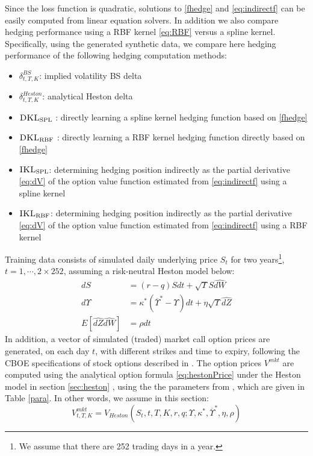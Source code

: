 \documentclass[letterpaper,12pt,titlepage,oneside,final]{book}
\numberwithin{equation}{section}
\theoremstyle{definition}
\newcommand{\Vmkt}{V^{mkt}}
\newcommand{\DKLs}{\bf\textsc{DKL}_{\text{SPL}}}
\newcommand{\DKLg}{\bf\textsc{DKL}_{\text{RBF}}}
\newcommand{\IKLs}{\bf\textsc{IKL}_{\text{SPL}}}
\newcommand{\IKLg}{\bf\textsc{IKL}_{\text{RBF}}}
\begin{document}
Since the loss function is  quadratic, solutions to \eqref{fhedge} and \eqref{eq:indirectf}
can be easily computed from linear equation solvers.
In addition we also compare hedging performance using a RBF kernel \eqref{eq:RBF} versus a spline kernel.
Specifically, using the generated synthetic data, we compare here hedging performance  of the following hedging computation methods:
 \begin{itemize}
 \item  $\delta^{BS}_{t,T,K}$:  implied  volatility BS delta
 \item $\delta^{Heston}_{t,T,K}$:   analytical Heston delta
 \item $\DKLs$ : directly learning a spline kernel hedging  function based on \eqref{fhedge}
 \item $\DKLg$ : directly learning a RBF kernel hedging  function directly based on \eqref{fhedge}
 \item ${\IKLs}$: determining hedging position indirectly  as the partial derivative \eqref{eq:dV} of the  option value function   estimated from \eqref{eq:indirectf} using a spline kernel

\item ${\IKLg}$: determining hedging position indirectly  as the partial derivative \eqref{eq:dV} of the  option value function   estimated from \eqref{eq:indirectf} using a RBF kernel

\end{itemize}

Training data consists of simulated daily underlying price $S_t$ for two years\footnote{We assume that there are 252 trading days in a year.}, $t=1,\cdots, 2\times 252$, assuming a  risk-neutral Heston model below:
\[
	\begin{split}
	dS&=(r-q) S dt + \sqrt{\Upsilon} S \hat{dW}\\
	d\Upsilon&=\kappa^*(\overline{\Upsilon}^*-\Upsilon)dt+\eta \sqrt{\Upsilon}\hat{dZ}\\
	E[\hat{dZ}\hat{dW}]&=\rho dt
	\end{split}
\]
In addition,  a vector of simulated (traded)  market call option prices  are  generated,  on each day $t$, with different strikes and time to expiry, following  the CBOE specifications of stock options described in  \cite{hull2006options}.
 The option prices $\Vmkt$ are  computed using  the analytical option 
 formula \eqref{eq:hestonPrice} under the Heston model \citep{heston1993closed} in section \ref{sec:heston} ,
 using the the parameters  from \citep{bakshi1997empirical}, which are given in Table \ref{para}. In other words, we assume in this section:
 \[
\Vmkt_{t,T,K}=V_{Heston}(S_t,t,T,K,r,q;\Upsilon,\kappa^*,\overline{\Upsilon}^*,\eta,\rho)
 \]
\end{document}
